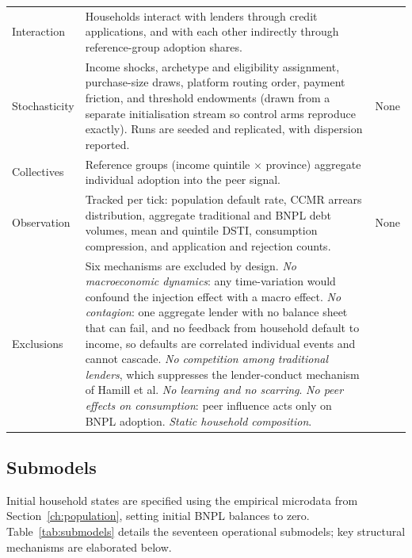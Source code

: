 \begin{longtable}{L{2.9cm}L{7.3cm}L{3.2cm}}
\addlinespace
Interaction & Households interact with lenders through credit applications, and with each other indirectly through reference-group adoption shares. & \cite{ackert2025bnpl} \\
\pagebreak
Stochasticity & Income shocks, archetype and eligibility assignment, purchase-size draws, platform routing order, payment friction, and threshold endowments (drawn from a separate initialisation stream so control arms reproduce exactly). Runs are seeded and replicated, with dispersion reported. & None \\
\addlinespace
Collectives & Reference groups (income quintile $\times$ province) aggregate individual adoption into the peer signal. & \cite{cardaci2018inequality} \\
\addlinespace
Observation & Tracked per tick: population default rate, \ac{CCMR} arrears distribution, aggregate traditional and \ac{BNPL} debt volumes, mean and quintile \ac{DSTI}, consumption compression, and application and rejection counts. & None \\
\addlinespace
Exclusions & Six mechanisms are excluded by design. \emph{No macroeconomic dynamics}: any time-variation would confound the injection effect with a macro effect. \emph{No contagion}: one aggregate lender with no balance sheet that can fail, and no feedback from household default to income, so defaults are correlated individual events and cannot cascade. \emph{No competition among traditional lenders}, which suppresses the lender-conduct mechanism of Hamill et al. \emph{No learning and no scarring}. \emph{No peer effects on consumption}: peer influence acts only on \ac{BNPL} adoption. \emph{Static household composition}. & \cite{hamill2023creditcard, cardaci2018inequality} \\
\end{longtable}

\subsection{Submodels}
\label{sec:submodels}

Initial household states are specified using the empirical microdata from Section~\ref{ch:population}, setting initial \ac{BNPL} balances to zero.
Table~\ref{tab:submodels} details the seventeen operational submodels; key structural mechanisms are elaborated below.

